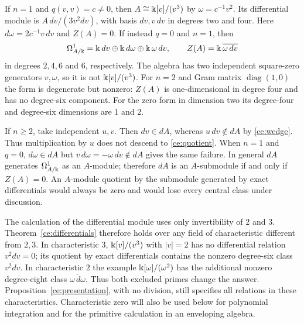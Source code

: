 \begin{example}
\label{ce:small}
If $n=1$ and $q(v,v)=c\ne0$, then
$A\cong \Bbbk[v]/(v^3)$ by $\omega=c^{-1}v^2$.  Its differential module is
$A\,dv/(3v^2dv)$, with basis $dv,v\,dv$ in degrees two and four.
Here $d\omega=2c^{-1}v\,dv$ and $Z(A)=0$.
If instead $q=0$ and $n=1$, then
\[
 \Omega^1_{A/\Bbbk}=\Bbbk\,dv\oplus \Bbbk\,d\omega\oplus \Bbbk\,\omega\,dv,
 \qquad Z(A)=\Bbbk\,\overline{\omega\,dv}
\]
in degrees $2,4,6$ and $6$, respectively.  The algebra has two independent
square-zero generators $v,\omega$, so it is not $\Bbbk[v]/(v^3)$.
For $n=2$ and Gram matrix $\operatorname{diag}(1,0)$ the form is
degenerate but nonzero: $Z(A)$ is one-dimensional in degree four and
has no degree-six component.  For the zero form in dimension two its
degree-four and degree-six dimensions are $1$ and $2$.
\end{example}

\begin{remark}
If $n\ge2$, take independent $u,v$.  Then $dv\in dA$, whereas
$u\,dv\notin dA$ by \eqref{ce:wedge}.  Thus multiplication by $u$
does not descend to \eqref{ce:quotient}.  When $n=1$ and $q=0$,
$d\omega\in dA$ but $v\,d\omega=-\omega\,dv\notin dA$ gives the same
failure.  In general $dA$ generates $\Omega^1_{A/\Bbbk}$ as an $A$-module;
therefore $dA$ is an $A$-submodule if and only if $Z(A)=0$.  An
$A$-module quotient by the submodule generated by exact differentials
would always be zero and would lose every central class under discussion.
\end{remark}

\begin{remark}
The calculation of the differential module uses only invertibility of
$2$ and $3$.  Theorem~\ref{ce:differentials} therefore holds over any
field of characteristic different from $2,3$.  In characteristic $3$,
$\Bbbk[v]/(v^3)$ with $|v|=2$ has no differential relation $v^2dv=0$;
its quotient by exact differentials contains the nonzero degree-six
class $\overline{v^2dv}$.  In characteristic $2$ the example
$\Bbbk[\omega]/(\omega^2)$ has the additional nonzero degree-eight class
$\overline{\omega\,d\omega}$.  Thus both excluded primes change the
answer.  Proposition~\ref{ce:presentation}, with no division, still
specifies all relations in these characteristics.  Characteristic zero
will also be used below for polynomial integration and for the
primitive calculation in an enveloping algebra.
\end{remark}

